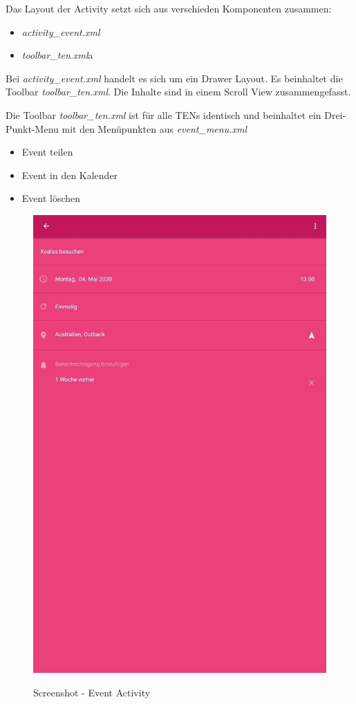 Das Layout der Activity setzt sich aus verschieden Komponenten zusammen:
\begin{itemize}
\item \textit{activity\_event.xml}
\item \textit{toolbar\_ten.xml}a
\end{itemize}
Bei \textit{activity\_event.xml} handelt es sich um ein Drawer Layout. Es beinhaltet die Toolbar \textit{toolbar\_ten.xml}. Die Inhalte sind in einem Scroll View zusammengefasst.

Die Toolbar \textit{toolbar\_ten.xml} ist für alle TENs identisch und beinhaltet ein Drei-Punkt-Menu mit den Menüpunkten aus \textit{event\_menu.xml}
\begin{itemize}
\item Event teilen
\item Event in den Kalender
\item Event löschen
\end{itemize}

\begin{figure}[H]
\centering
\begin{minipage}[t]{1\textwidth} %
\caption{Screenshot - Event Activity} %
\includegraphics[width=13 cm]{img/Screenshot_EventActivity.jpg}\\ %
\end{minipage}
\end{figure}

